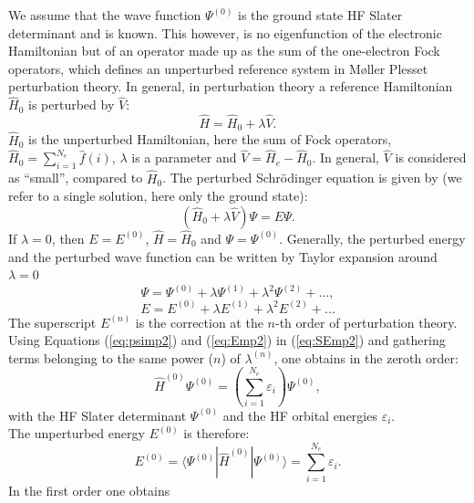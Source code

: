 \documentclass[11pt,DIV=13,BCOR=5mm,a4paper,headinclude]{scrbook}
\begin{document}
We assume that the wave function $\Psi^{(0)}$ is the ground state HF Slater determinant and is known.
This however, is no eigenfunction of the electronic Hamiltonian but of an operator made up as the sum of the one-electron Fock operators, which defines an unperturbed reference system in M\o{}ller Plesset perturbation theory.
In general, in perturbation theory a reference Hamiltonian $\hat{H}_0$ is perturbed by $\hat{V}$:
\begin{equation}
 \hat{H} = \hat{H}_0 + \lambda \hat{V}.
\end{equation}
$\hat{H}_0$ is the unperturbed Hamiltonian, here the sum of Fock operators, $\hat{H}_0=\sum_{i=1}^{N_e}\hat{f}(i)$, $\lambda$ is a parameter and $\hat{V}=\hat{H}_e - \hat{H}_0$.
In general, $\hat{V}$ is considered as ``small'', compared to $\hat{H}_0$.
The perturbed Schrödinger equation is given by (we refer to a single solution, here only the ground state):
\begin{equation}\label{eq:SEmp2}
 (\hat{H}_0 + \lambda \hat{V})\Psi = E\Psi.
\end{equation}
If $\lambda=0$, then $E=E^{(0)}$, $\hat{H} = \hat{H}_0$ and $\Psi=\Psi^{(0)}$.
Generally, the perturbed energy and the perturbed wave function can be written by Taylor expansion around $\lambda=0$
\begin{equation}\label{eq:psimp2}
 \Psi = \Psi^{(0)} + \lambda \Psi^{(1)} + \lambda^2\Psi^{(2)} + ...,
\end{equation}
\begin{equation}\label{eq:Emp2}
 E = E^{(0)} + \lambda E^{(1)} + \lambda^2E^{(2)} + ...
\end{equation}
The superscript $E^{(n)}$ is the correction at the $n$-th order of perturbation theory.\\
Using Equations (\ref{eq:psimp2}) and (\ref{eq:Emp2}) in (\ref{eq:SEmp2}) and gathering terms belonging to the same power ($n$) of $\lambda^{(n)}$, one obtains in the zeroth order:
\begin{equation}
 \hat{H}^{(0)}\Psi^{(0)}=(\sum_{i=1}^{N_e} \varepsilon_i)\Psi^{(0)},
\end{equation}
with the HF Slater determinant $\Psi^{(0)}$ and the HF orbital energies $\varepsilon_i$.\\
The unperturbed energy $E^{(0)}$ is therefore:
\begin{equation}
 E^{(0)} = \langle\Psi^{(0)}|\hat{H}^{(0)}|\Psi^{(0)}\rangle=\sum\limits_{i=1}^{N_e}\varepsilon_i.
\end{equation}
In the first order one obtains
\end{document}

